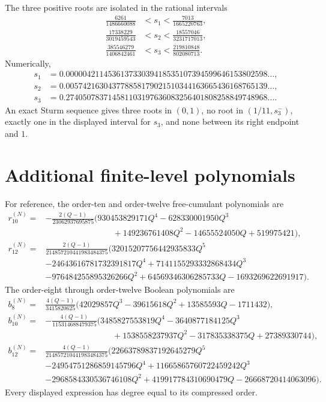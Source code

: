 \documentclass[11pt,oneside]{article}
\theoremstyle{definition}
\theoremstyle{remark}
\newcommand{\SturmPositiveRoot}[1]{s_{#1}}
\begin{document}
The three positive roots are isolated in the rational intervals
\begin{align*}
\frac{6261}{1486660088}&<\SturmPositiveRoot{1}<\frac{7013}{1665220763},\\
\frac{17338229}{3019459543}&<\SturmPositiveRoot{2}<\frac{18557046}{3231717013},\\
\frac{385546279}{1406842461}&<\SturmPositiveRoot{3}<\frac{219810848}{802080713}.
\end{align*}
Numerically,
\begin{align*}
\SturmPositiveRoot{1}&=0.000004211453613733039418535107394599646153802598\ldots,\\
\SturmPositiveRoot{2}&=0.005742163043778858179021510344163665436168765139\ldots,\\
\SturmPositiveRoot{3}&=0.274050783714581103197636083256401808258849748968\ldots.
\end{align*}
An exact Sturm sequence gives three roots in \((0,1)\), no root in \((1/11,\SturmPositiveRoot{3}^-)\), exactly one in the displayed interval for \(\SturmPositiveRoot{3}\), and none between its right endpoint and \(1\).


\section{Additional finite-level polynomials}
For reference, the order-ten and order-twelve free-cumulant polynomials are
{\small
\begin{align*}
r_{10}^{(N)}={}&-\frac{2(Q-1)}{23062937695875}
\bigl(930453829171Q^4-628330001950Q^3\\
&\hspace{8em}+149236761408Q^2-14655524050Q+519975421\bigr),\\
r_{12}^{(N)}={}&\frac{2(Q-1)}{214857210441983484375}
\bigl(32015207756442935833Q^5\\
&-24643616781732391817Q^4+7141155293332868434Q^3\\
&-976484255895326266Q^2+64569346306285733Q-1693269622691917\bigr).
\end{align*}}
The order-eight through order-twelve Boolean polynomials are
{\small
\begin{align*}
b_8^{(N)}={}&\frac{4(Q-1)}{3415820625}
\bigl(42029857Q^3-39615618Q^2+13585593Q-1711432\bigr),\\
b_{10}^{(N)}={}&-\frac{4(Q-1)}{115314688479375}
\bigl(3485827553819Q^4-3640877184125Q^3\\
&\hspace{8em}+1538558237937Q^2-317835338375Q+27389330744\bigr),\\
b_{12}^{(N)}={}&\frac{4(Q-1)}{214857210441983484375}
\bigl(22663789837192645279Q^5\\
&-24954751286859145796Q^4+11665865760722459242Q^3\\
&-2968584330536746108Q^2+419917784310690479Q-26668720414063096\bigr).
\end{align*}}
Every displayed expression has degree equal to its compressed order.
\end{document}
